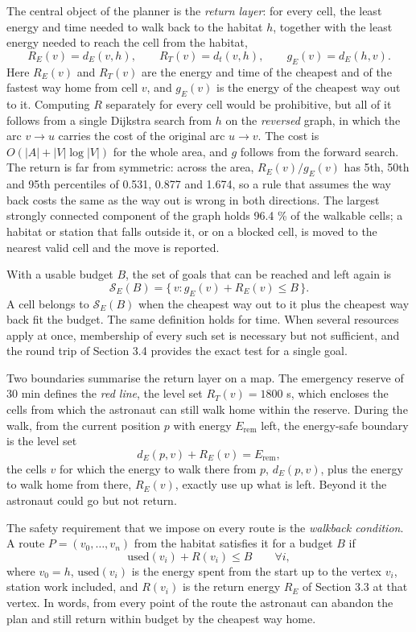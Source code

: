 \documentclass[11pt,a4paper]{article}
\begin{document}
The central object of the planner is the \emph{return layer}: for every cell, the least energy and time needed to walk back to the habitat $h$, together with the least energy needed to reach the cell from the habitat, \[R_E(v) = d_E(v, h),\qquad R_T(v) = d_t(v, h),\qquad g_E(v) = d_E(h, v).\] Here $R_E(v)$ and $R_T(v)$ are the energy and time of the cheapest and of the fastest way home from cell $v$, and $g_E(v)$ is the energy of the cheapest way out to it. Computing $R$ separately for every cell would be prohibitive, but all of it follows from a single Dijkstra search from $h$ on the \emph{reversed} graph, in which the arc $v \to u$ carries the cost of the original arc $u \to v$. The cost is $O(|A| + |V|\log|V|)$ for the whole area, and $g$ follows from the forward search. The return is far from symmetric: across the area, $R_E(v)/g_E(v)$ has 5th, 50th and 95th percentiles of 0.531, 0.877 and 1.674, so a rule that assumes the way back costs the same as the way out is wrong in both directions. The largest strongly connected component of the graph holds 96.4 \% of the walkable cells; a habitat or station that falls outside it, or on a blocked cell, is moved to the nearest valid cell and the move is reported.

With a usable budget $B$, the set of goals that can be reached and left again is \[\mathcal S_E(B) = \{\, v : g_E(v) + R_E(v) \le B \,\}.\] A cell belongs to $\mathcal S_E(B)$ when the cheapest way out to it plus the cheapest way back fit the budget. The same definition holds for time. When several resources apply at once, membership of every such set is necessary but not sufficient, and the round trip of Section 3.4 provides the exact test for a single goal.

Two boundaries summarise the return layer on a map. The emergency reserve of 30 min \cite{NASA-EMU} defines the \emph{red line}, the level set $R_T(v) = 1800$ s, which encloses the cells from which the astronaut can still walk home within the reserve. During the walk, from the current position $p$ with energy $E_\text{rem}$ left, the energy-safe boundary is the level set \[d_E(p, v) + R_E(v) = E_\text{rem},\] the cells $v$ for which the energy to walk there from $p$, $d_E(p, v)$, plus the energy to walk home from there, $R_E(v)$, exactly use up what is left. Beyond it the astronaut could go but not return.

The safety requirement that we impose on every route is the \emph{walkback condition}. A route $P = (v_0, \dots, v_n)$ from the habitat satisfies it for a budget $B$ if \[\text{used}(v_i) + R(v_i) \le B \qquad \forall i,\] where $v_0 = h$, $\text{used}(v_i)$ is the energy spent from the start up to the vertex $v_i$, station work included, and $R(v_i)$ is the return energy $R_E$ of Section 3.3 at that vertex. In words, from every point of the route the astronaut can abandon the plan and still return within budget by the cheapest way home.
\end{document}
